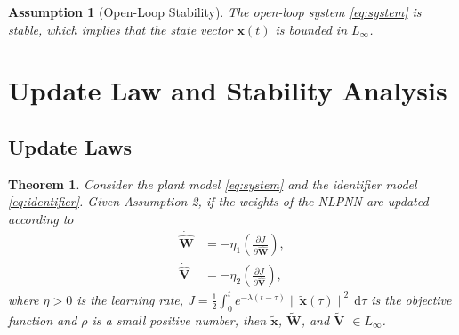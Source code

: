 \documentclass[11pt, a4paper]{article}
\newtheorem{theorem}{Theorem}
\newtheorem{assumption}{Assumption}
\newcommand{\ud}{\,\mathrm{d}}
\newcommand{\xtilde}{\tilde{\bm{x}}}
\newcommand{\What}{\hat{\mathbf{W}}}
\newcommand{\Vhat}{\hat{\mathbf{V}}}
\begin{document}
\begin{assumption}[Open-Loop Stability]
The open-loop system \eqref{eq:system} is stable, which implies that the state vector $\bm{x}(t)$ is bounded in $L_\infty$. 
\end{assumption}


\section{Update Law and Stability Analysis}

\subsection{Update Laws}
\begin{theorem}
Consider the plant model \eqref{eq:system} and the identifier model \eqref{eq:identifier}. Given Assumption 2, if the weights of the NLPNN are updated according to
\begin{align}
    \dot{\mathbf{\What}} &= -\eta_1\left(\frac{\partial J}{\partial \hat{\mathbf{W}}}\right) ,\\
    \dot{\mathbf{\Vhat}} &= -\eta_2\left(\frac{\partial J}{\partial \hat{\mathbf{V}}}\right) ,
\end{align}
where $\eta > 0$ is the learning rate, $J = \frac{1}{2} \int_{0}^{t} e^{-\lambda(t-\tau)} \|\xtilde(\tau)\|^2 \ud\tau$ is the objective function and $\rho$ is a small positive number, then $\tilde{\bm{x}}$, $\tilde{\mathbf{W}}$, and $\tilde{\mathbf{V}}$ $\in L_\infty$. 
\end{theorem}
\end{document}
